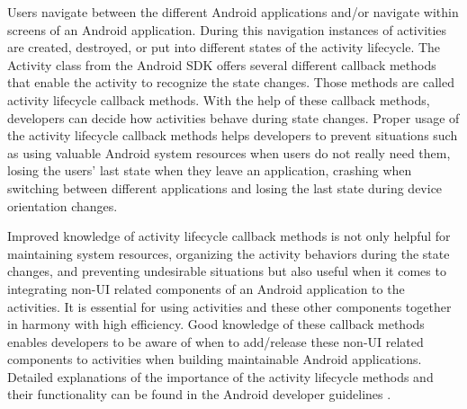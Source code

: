 Users navigate between the different Android applications and/or navigate within screens of an Android application. During this navigation instances of activities are created, destroyed, or put into different states of the activity lifecycle. The Activity class from the Android SDK offers several different callback methods that enable the activity to recognize the state changes. Those methods are called activity lifecycle callback methods. With the help of these callback methods, developers can decide how activities behave during state changes. Proper usage of the activity lifecycle callback methods helps developers to prevent situations such as using valuable Android system resources when users do not really need them, losing the users' last state when they leave an application, crashing when switching between different applications and losing the last state during device orientation changes. 

Improved knowledge of activity lifecycle callback methods is not only helpful for maintaining system resources, organizing the activity behaviors during the state changes, and preventing undesirable situations but also useful when it comes to integrating non-UI related components of an Android application to the activities. It is essential for using activities and these other components together in harmony with high efficiency. Good knowledge of these callback methods enables developers to be aware of when to add/release these non-UI related components to activities when building maintainable Android applications. Detailed explanations of the importance of the activity lifecycle methods and their functionality can be found in the Android developer guidelines \cite{9}.
